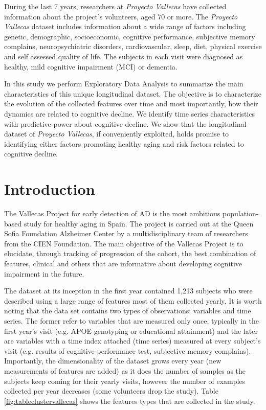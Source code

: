 \documentclass[11pt]{article}
\theoremstyle{definition}
\theoremstyle{remark}
\begin{document}
During the last 7 years, researchers at \emph{Proyecto Vallecas} have collected information about the project's volunteers, aged 70 or more. The \emph{Proyecto Vallecas} dataset includes information about a wide range of factors including genetic, demographic, socioeconomic, cognitive performance, subjective memory complains, neuropsychiatric disorders, cardiovascular, sleep, diet, physical exercise and self assessed quality of life. The subjects in each visit were diagnosed as healthy, mild cognitive impairment (MCI) or dementia. 

In this study we perform Exploratory Data Analysis to summarize the main characteristics of this unique longitudinal dataset. The objective is to characterize the evolution of the collected features over time and most importantly, how their dynamics are related to cognitive decline. 
We identify time series characteristics with predictive power about cognitive decline. We show that the longitudinal dataset of \emph{Proyecto Vallecas}, if conveniently exploited, holds promise to identifying either factors promoting healthy aging and risk factors related to cognitive decline. 
 
\section{Introduction}
\label{se:int}
The Vallecas Project for early detection of AD is the most ambitious population-based study for healthy aging in Spain. The project is carried out at the Queen Sofia Foundation Alzheimer Center by a multidisciplinary team of researchers from the CIEN Foundation. The main objective of the Vallecas Project is to elucidate, through tracking of progression of the cohort, the best combination of features, clinical and others that are informative about developing cognitive impairment in the future. 

The dataset at its inception in the first year contained 1,213 subjects who were described using a large range of features most of them collected yearly. 
It is worth noting that the data set contains two types of observations: variables and time series. The former refer to variables that are measured only once, typically in the first year's visit (e.g. APOE genotyping or educational attainment) and the later are variables with a time index attached (time series) measured at every subject's visit (e.g. results of cognitive performance test, subjective memory complains).
Importantly, the dimensionality of the dataset grows every year (new measurements of features are added) as it does the number of samples as the subjects keep coming for their yearly visits, however the number of examples collected per year decreases (some volunteers drop the study). Table \ref{fig:tableclustervallecas} shows the features types that are collected in the study.
\end{document}

